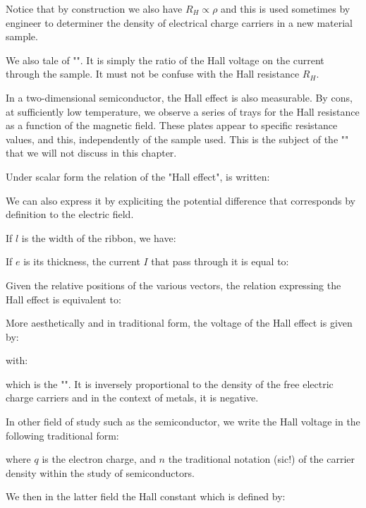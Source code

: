 	Notice that by construction we also have $R_H\propto \rho$ and this is used sometimes by engineer to determiner the density of electrical charge carriers in a new material sample.
	\begin{tcolorbox}[title=Remark,colframe=black,arc=10pt]
	We also tale of "". It is simply the ratio of the Hall voltage on the current through the sample. It must not be confuse with the Hall resistance $R_H$. 
	\end{tcolorbox}
	In a two-dimensional semiconductor, the Hall effect is also measurable. By cons, at sufficiently low temperature, we observe a series of trays for the Hall resistance as a function of the magnetic field. These plates appear to specific resistance values, and this, independently of the sample used. This is the subject of the "" that we will not discuss in this chapter.

	Under scalar form the relation of the "Hall effect", is written:
	
	We can also express it by expliciting the potential difference that corresponds by definition to the electric field.

	If $l$ is the width of the ribbon, we have:
	
	If $e$ is its thickness, the current $I$ that pass through it is equal to:
	
	Given the relative positions of the various vectors, the relation expressing the Hall effect is equivalent to:
	
	More aesthetically and in traditional form, the voltage of the Hall effect is given by:
	
	with:
	
	which is the "". It is inversely proportional to the density of the free electric charge carriers and in the context of metals, it is negative.

	In other field of study such as the semiconductor, we write the Hall voltage in the following traditional form:
	
	where $q$ is the electron charge, and $n$ the traditional notation (sic!) of the carrier density within the study of semiconductors.

	We then in the latter field the Hall constant which is defined by:
	
